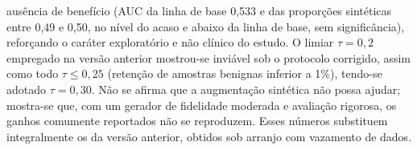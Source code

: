 \documentclass[
	12pt,				%
	openright,			%
	oneside,			%
	a4paper,			%
	tcc,			%
	]{ABNT-DC-UEL}
\begin{document}
\begin{resumo}
ausência de benefício (AUC da linha de base 0,533 e das proporções sintéticas entre 0,49 e 0,50, no nível do acaso e abaixo da linha de base, sem significância), reforçando o caráter exploratório e não clínico do estudo. O limiar $\tau = 0{,}2$ empregado na versão anterior mostrou-se inviável sob o protocolo corrigido, assim como todo $\tau \le 0{,}25$ (retenção de amostras benignas inferior a 1\%), tendo-se adotado $\tau = 0{,}30$. Não se afirma que a augmentação sintética não possa ajudar; mostra-se que, com um gerador de fidelidade moderada e avaliação rigorosa, os ganhos comumente reportados não se reproduzem. Esses números substituem integralmente os da versão anterior, obtidos sob arranjo com vazamento de dados.
\end{resumo}

\end{document}
